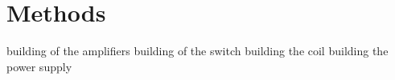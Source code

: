 
\chapter{Methods}

building of the amplifiers
building of the switch
building the coil
building the power supply
